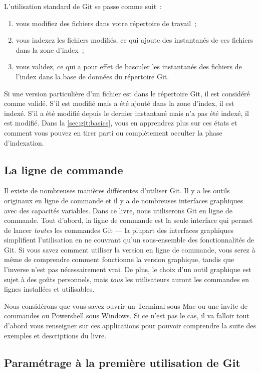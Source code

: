 L'utilisation standard de Git se passe comme suit :
\begin{enumerate}
\item vous modifiez des fichiers dans votre répertoire de travail ;
\item vous indexez les fichiers modifiés, ce qui ajoute des instantanés de ces fichiers dans la zone d'index ;
\item vous validez, ce qui a pour effet de basculer les instantanés des fichiers de l'index dans la base de données du répertoire Git.
\end{enumerate}

Si une version particulière d'un fichier est dans le répertoire Git, il est considéré comme validé.
S'il est modifié mais a été ajouté dans la zone d'index, il est indexé.
S'il a été modifié depuis le dernier instantané mais n'a pas été indexé, il est modifié.
Dans la \autoref{sec:git:basics}, vous en apprendrez plus sur ces états et comment vous pouvez en tirer parti ou complètement occulter la phase d'indexation.

\subsection{La ligne de commande}

Il existe de nombreuses manières différentes d'utiliser Git.
Il y a les outils originaux en ligne de commande et il y a de nombreuses interfaces graphiques avec des capacités variables.
Dans ce livre, nous utiliserons Git en ligne de commande.
Tout d'abord, la ligne de commande est la seule interface qui permet de lancer \emph{toutes} les commandes Git --- la plupart des interfaces graphiques simplifient l'utilisation en ne couvrant qu'un sous-ensemble des fonctionnalités de Git.
Si vous savez comment utiliser la version en ligne de commande, vous serez à même de comprendre comment fonctionne la version graphique, tandis que l'inverse n'est pas nécessairement vrai.
De plus, le choix d'un outil graphique est sujet à des goûts personnels, mais \emph{tous} les utilisateurs auront les commandes en lignes installées et utilisables.

Nous considérons que vous savez ouvrir un Terminal sous Mac ou une invite de commandes ou Powershell sous Windows.
Si ce n'est pas le cas, il va falloir tout d'abord vous renseigner sur ces applications pour pouvoir comprendre la suite des exemples et descriptions du livre.

\subsection{Paramétrage à la première utilisation de Git}
\label{sec:git:first_time}

